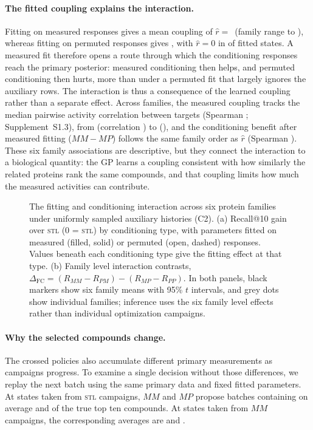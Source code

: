 \documentclass[10pt,letterpaper,runningheads]{llncs}
\newcommand{\stl}{\textsc{stl}}
\begin{document}
\paragraph{The fitted coupling explains the interaction.}
Fitting on
measured responses gives a mean coupling of $\hat r=\,$\couplingMeasured{}
(family range \couplingMeasuredMin{} to \couplingMeasuredMax{}), whereas
fitting on permuted responses gives \couplingPermuted{}, with $\hat r=0$
in \couplingPermutedZeroPct{} of fitted states. A measured fit therefore
opens a route through which the conditioning responses reach the primary
posterior: measured conditioning then helps, and permuted conditioning
then hurts, more than under a permuted fit that largely ignores the
auxiliary rows. The interaction is thus a consequence of the learned
coupling rather than a separate effect. Across families, the measured
coupling tracks the median pairwise activity correlation between
targets (Spearman \couplingVsCorr{}; Supplement~S1.3), from
\couplingMeasuredLowFamily{} (correlation \couplingLowFamilyCorr{})
to \couplingMeasuredHighFamily{} (\couplingHighFamilyCorr{}), and the
conditioning benefit after measured fitting ($MM-MP$) follows the same
family order as $\hat r$ (Spearman \condVsCoupling{}). These six family
associations are descriptive, but they connect the interaction to a
biological quantity: the GP learns a coupling consistent with how
similarly the related proteins rank the same compounds, and that
coupling limits how much the measured activities can contribute.

\begin{figure}[!htbp]
\centering

\caption{The fitting and conditioning interaction across six protein families
under uniformly sampled auxiliary histories (C2).
(a) Recall@10 gain over \stl{} (0 = \stl{}) by conditioning type, with
parameters fitted on measured (filled, solid) or permuted (open, dashed)
responses. Values beneath each conditioning type give the fitting effect at
that type.
(b) Family level interaction contrasts,
$\Delta_{\mathrm{FC}}=(R_{MM}-R_{PM})-(R_{MP}-R_{PP})$.
In both panels, black markers show six family means with 95\% $t$
intervals, and grey dots show individual families; inference uses the six
family level effects rather than individual optimization campaigns.}
\label{fig:interaction}
\end{figure}

\paragraph{Why the selected compounds change.}
The crossed policies also accumulate different primary measurements
as campaigns progress. To examine a single decision without those
differences, we replay the next batch using the same primary data and
fixed fitted parameters. At states taken from \stl{} campaigns, $MM$
and $MP$ propose batches containing on average
\crossStlAnchorMMBatchHits{} and \crossStlAnchorMPBatchHits{} of the
true top ten compounds. At states taken from $MM$ campaigns, the
corresponding averages are \crossMtAnchorMMBatchHits{} and
\crossMtAnchorMPBatchHits{}.
\end{document}
